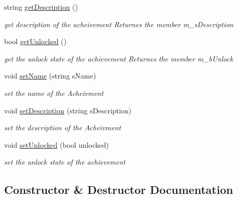 \begin{DoxyCompactItemize}
\hypertarget{class_achievement_a68f758c3db2d4873ad5452fcea1a84b3}{}\label{class_achievement_a68f758c3db2d4873ad5452fcea1a84b3} 
string \hyperlink{class_achievement_a68f758c3db2d4873ad5452fcea1a84b3}{get\+Description} ()
\begin{DoxyCompactList}\small\item\em get description of the acheivement Returnes the member m\+\_\+s\+Description \end{DoxyCompactList}\item 
\hypertarget{class_achievement_a1f0bb77d394b03c28b636688d7cbbf2b}{}\label{class_achievement_a1f0bb77d394b03c28b636688d7cbbf2b} 
bool \hyperlink{class_achievement_a1f0bb77d394b03c28b636688d7cbbf2b}{get\+Unlocked} ()
\begin{DoxyCompactList}\small\item\em get the unlock state of the achievement Returnes the member m\+\_\+b\+Unlock \end{DoxyCompactList}\item 
void \hyperlink{class_achievement_a9e0c9c6c154411d3529bca657c579beb}{set\+Name} (string s\+Name)
\begin{DoxyCompactList}\small\item\em set the name of the Acheivment \end{DoxyCompactList}\item 
void \hyperlink{class_achievement_a1e43852ad31739236d393f856e1f8f12}{set\+Description} (string s\+Description)
\begin{DoxyCompactList}\small\item\em set the description of the Acheivment \end{DoxyCompactList}\item 
void \hyperlink{class_achievement_a59aa51eab50fed4fb72eee2ff733e3ac}{set\+Unlocked} (bool unlocked)
\begin{DoxyCompactList}\small\item\em set the unlock state of the achievement \end{DoxyCompactList}\end{DoxyCompactItemize}


\subsection{Constructor \& Destructor Documentation}
\hypertarget{class_achievement_ad36246aeeae27b2e82a3a6d259cd483d}{}\label{class_achievement_ad36246aeeae27b2e82a3a6d259cd483d} 
